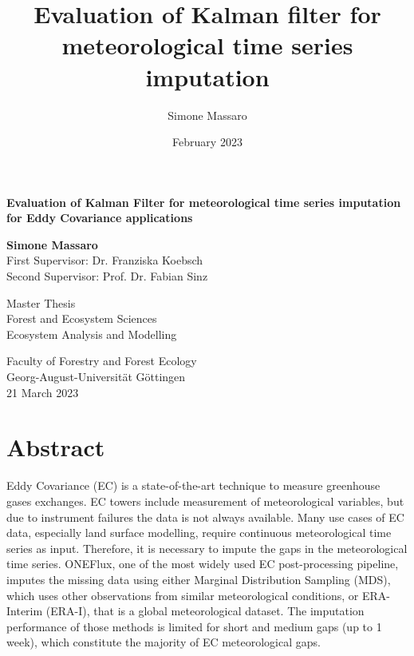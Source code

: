 \documentclass{article}
\title{Evaluation of Kalman filter for meteorological time series imputation}
\author{Simone Massaro}
\date{February 2023}
\let\Oldsection\section
\renewcommand{\section}{\FloatBarrier\Oldsection}
\begin{document}
\newcommand{\vv}[1]{\texttt{#1}}

\begin{titlepage}
    \begin{center}
        \vspace*{1cm}

        \Huge
        \textbf{Evaluation of Kalman Filter for meteorological time series imputation for Eddy Covariance applications}

        \vspace{0.5cm}
        \LARGE

        \vspace{1.5cm}

        \textbf{Simone Massaro} \\
        \vspace{1.5cm}
        \Large
        First Supervisor: Dr. Franziska Koebsch\\
        Second Supervisor: Prof. Dr. Fabian Sinz
        \vfill

        Master Thesis\\
        Forest and Ecosystem Sciences\\
        Ecosystem Analysis and Modelling

        \vspace{0.8cm}

        \Large
        Faculty of Forestry and Forest Ecology \\
        Georg-August-Universität Göttingen \\
        \vspace{1cm}
        21 March 2023

    \end{center}
\end{titlepage}
\clearpage

\section*{Abstract}

Eddy Covariance (EC) is a state-of-the-art technique to measure greenhouse gases exchanges. EC towers include measurement of meteorological variables, but due to instrument failures the data is not always available. Many use cases of EC data, especially land surface modelling, require continuous meteorological time series as input. Therefore, it is necessary to impute the gaps in the meteorological time series. ONEFlux, one of the most widely used EC post-processing pipeline, imputes the missing data using either Marginal Distribution Sampling (MDS), which uses other observations from similar meteorological conditions, or ERA-Interim (ERA-I), that is a global meteorological dataset. The imputation performance of those methods is limited for short and medium gaps (up to 1 week), which constitute the majority of EC meteorological gaps.
\end{document}
